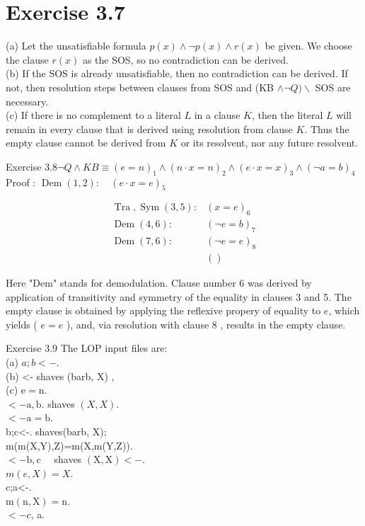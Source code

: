 \documentclass[10pt]{book}
\begin{document}
\section*{Exercise 3.7}
(a) Let the unsatisfiable formula $p(x) \wedge \neg p(x) \wedge r(x)$ be given. We choose the clause $r(x)$ as the SOS, so no contradiction can be derived.\\
(b) If the SOS is already unsatisfiable, then no contradiction can be derived. If not, then resolution steps between clauses from SOS and (KB $\wedge \neg Q) \backslash$ SOS are necessary.\\
(c) If there is no complement to a literal $L$ in a clause $K$, then the literal $L$ will remain in every clause that is derived using resolution from clause $K$. Thus the empty clause cannot be derived from $K$ or its resolvent, nor any future resolvent.


Exercise $3.8 \neg Q \wedge K B \equiv(e=n)_{1} \wedge(n \cdot x=n)_{2} \wedge(e \cdot x=x)_{3} \wedge(\neg a=b)_{4}$\\
Proof : $\operatorname{Dem}(1,2): \quad(e \cdot x=e)_{5}$

$$
\begin{array}{ll}
\operatorname{Tra}, \operatorname{Sym}(3,5): & (x=e)_{6} \\
\operatorname{Dem}(4,6): & (\neg e=b)_{7} \\
\operatorname{Dem}(7,6): & (\neg e=e)_{8} \\
& ()
\end{array}
$$

Here "Dem" stands for demodulation. Clause number 6 was derived by application of transitivity and symmetry of the equality in clauses 3 and 5. The empty clause is obtained by applying the reflexive propery of equality to $e$, which yields ( $e=e$ ), and, via resolution with clause 8 , results in the empty clause.

Exercise 3.9 The LOP input files are:\\
(a) $a ; b<-$.\\
(b) <- shaves (barb, X) ,\\
(c) $\mathrm{e}=\mathrm{n}$.\\
$<-\mathrm{a}, \mathrm{b}$. shaves $(X, X)$.\\
$<-\mathrm{a}=\mathrm{b}$.\\
b;c<-. shaves(barb, X);\\
m(m(X,Y),Z)=m(X,m(Y,Z)).\\
$<-\mathrm{b}, \mathrm{c} \quad$ shaves $(\mathrm{X}, \mathrm{X})<-$.\\
$m(e, X)=X$.\\
c;a<-.\\
$\mathrm{m}(\mathrm{n}, \mathrm{X})=\mathrm{n}$.\\
$<-c$, a.
\end{document}
